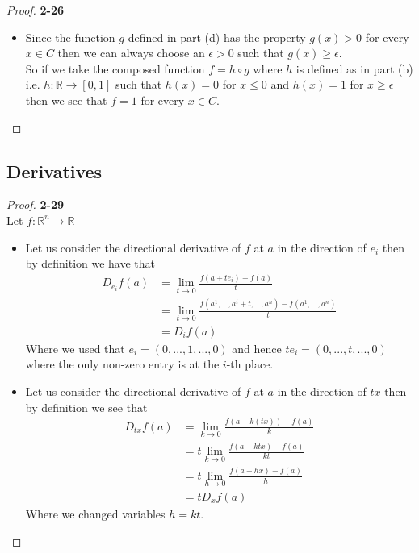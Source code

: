 \documentclass[11pt]{article}
\newcommand{\R}{\mathbb{R}}
\theoremstyle{definition}
\begin{document}
\begin{proof}{\textbf{2-26}}
\begin{itemize}
\cleardoublepage
\item [(e)] Since the function $g$ defined in part (d) has the property
$g(x) > 0$ for every $x \in C$ then we can always choose an $\epsilon > 0$
such that $g(x) \geq \epsilon$.
\\
So if we take the composed function $f = h \circ g$ where $h$ is defined as in
part (b) i.e. $h :\R \to [0,1]$ such that $h(x) = 0$ for $x \leq 0$ and
$h(x) = 1$ for $x\geq \epsilon$ then we see that $f = 1$ for every $x \in C$.
\end{itemize}
\end{proof}

\cleardoublepage
\subsection*{Derivatives}
\begin{proof}{\textbf{2-29}}\\
Let $f:\R^n \to \R$
\begin{itemize}
\item [(a)] Let us consider the directional derivative of $f$ at $a$ in the
direction of $e_i$ then by definition we have that
\begin{align*}
    D_{e_i}f(a) &= \lim_{t\to 0}\frac{f(a + te_i) - f(a)}{t}\\
    &= \lim_{t\to 0}\frac{f(a^1, ...,a^i + t, ..., a^n) - f(a^1, ..., a^n)}{t}\\
    &= D_{i}f(a)
\end{align*}
Where we used that $e_i = (0, ..., 1,..., 0)$ and hence
$te_i = (0, ..., t,..., 0)$ where the only non-zero entry is at the $i$-th
place.

\item [(b)] Let us consider the directional derivative of $f$ at $a$ in the 
direction of $tx$ then by definition we see that
\begin{align*}
    D_{tx}f(a) &= \lim_{k\to 0}\frac{f(a + k(tx)) - f(a)}{k}\\
    &= t\lim_{k\to 0}\frac{f(a + ktx) - f(a)}{kt}\\
    &= t\lim_{h\to 0}\frac{f(a + hx) - f(a)}{h}\\
    &= tD_{x}f(a)
\end{align*}
Where we changed variables $h = kt$.


\end{itemize}
\end{proof}
\end{document}
